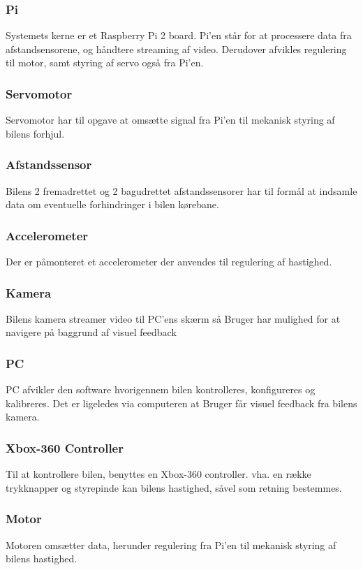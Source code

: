 \subsubsection{Pi}
Systemets kerne er et Raspberry Pi 2 board.
Pi'en står for at processere data fra afstandsensorene, og håndtere streaming af video. Derudover afvikles regulering til motor, samt styring af servo også fra Pi'en. 

\subsubsection{Servomotor}
Servomotor har til opgave at omsætte signal fra Pi'en til mekanisk styring af bilens forhjul. 

\subsubsection{Afstandssensor}
Bilens 2 fremadrettet og 2 bagudrettet afstandssensorer har til formål at indsamle data om eventuelle forhindringer i bilen kørebane. 

\subsubsection{Accelerometer}
Der er påmonteret et accelerometer der anvendes til regulering af hastighed.

\subsubsection{Kamera}
Bilens kamera streamer video til PC'ens skærm så Bruger har mulighed for at navigere på baggrund af visuel feedback

\subsubsection{PC}
PC afvikler den software hvorigennem bilen kontrolleres, konfigureres og kalibreres. Det er ligeledes via computeren at Bruger får visuel feedback fra bilens kamera. 

\subsubsection{Xbox-360 Controller}
Til at kontrollere bilen, benyttes en Xbox-360 controller. vha. en række trykknapper og styrepinde kan bilens hastighed, såvel som retning bestemmes. 

\subsubsection{Motor}
Motoren omsætter data, herunder regulering fra Pi'en til mekanisk styring af bilens hastighed.

